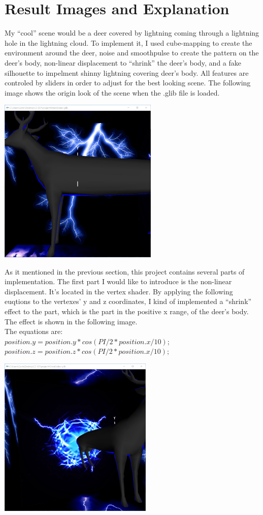 \documentclass[letterpaper,14pt,titlepage,fleqn]{article}
\begin{document}
\section{Result Images and Explanation}
My ``cool'' scene would be a deer covered by lightning coming through a lightning hole in the lightning cloud. To implement it, I used cube-mapping to create the environment around the deer, noise and smoothpulse to create the pattern on the deer's body, non-linear displacement to ``shrink'' the deer's body, and a fake silhouette to impelment shinny lightning covering deer's body. All features are controled by sliders in order to adjust for the best looking scene. The following image shows the origin look of the scene when the .glib file is loaded.
\begin{center}
	\includegraphics[width=3in]{origin.jpg}
\end{center}
As it mentioned in the previous section, this project contains several parts of implementation. The first part I would like to introduce is the non-linear displacement. It's located in the vertex shader. By applying the following euqtions to the vertexes' y and z coordinates, I kind of implemented a ``shrink'' effect to the part, which is the part in the positive x range, of the deer's body. The effect is shown in the following image.\\
The equations are: \\
$position.y = position.y*cos(PI/2*position.x/10);$\\
$position.z = position.z*cos(PI/2*position.x/10);$
\begin{center}
	\includegraphics[width=2.9in]{shrink.jpg}
\end{center}
\end{document}
